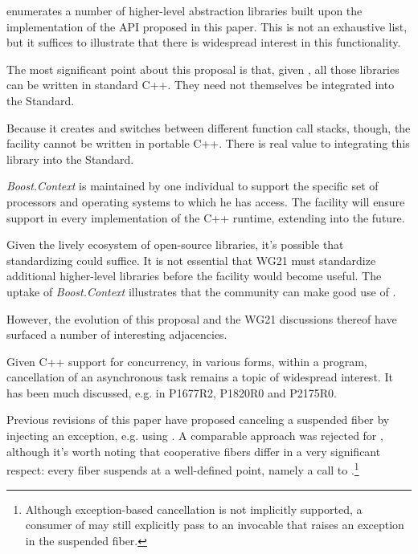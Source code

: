 

 enumerates a number of higher-level abstraction libraries
built upon the \bcontext\xspace implementation of the API proposed in this paper.
This is not an exhaustive list, but it suffices to illustrate that there is
widespread interest in this functionality.

The most significant point about this proposal is that, given \fiber, all
those libraries can be written in standard C++. They need not themselves be
integrated into the Standard.

Because it creates and switches between different function call stacks,
though, the \fiber facility cannot be written in portable C++. There is real
value to integrating this library into the Standard.

\emph{Boost.Context} is maintained by one individual to support the specific
set of processors and operating systems to which he has access. The \fiber
facility will ensure support in every implementation of the C++ runtime,
extending into the future.

Given the lively ecosystem of open-source libraries, it's possible that
standardizing  could suffice. It is not essential that
WG21 must standardize additional higher-level libraries before the facility
would become useful. The uptake of \emph{Boost.Context} illustrates that the
community can make good use of .

However, the evolution of this proposal and the WG21 discussions thereof have
surfaced a number of interesting adjacencies.


Given C++ support for concurrency, in various forms, within a program,
cancellation of an asynchronous task remains a topic of widespread interest.
It has been much discussed, e.g. in P1677R2\cite{P1677R2},
P1820R0\cite{P1820R0} and P2175R0\cite{P2175R0}.

Previous revisions of this paper have proposed canceling a suspended fiber by
injecting an exception, e.g. using \fiber\cpp{::}\resumewith. A comparable
approach was rejected for , although it's worth noting that
cooperative fibers differ in a very significant respect: every fiber suspends
at a well-defined point, namely a call to \resumewith.\footnote{Although
exception-based cancellation is not implicitly supported, a consumer of \fiber
may still explicitly pass to \resumewith an invocable that raises an exception
in the suspended fiber.}

